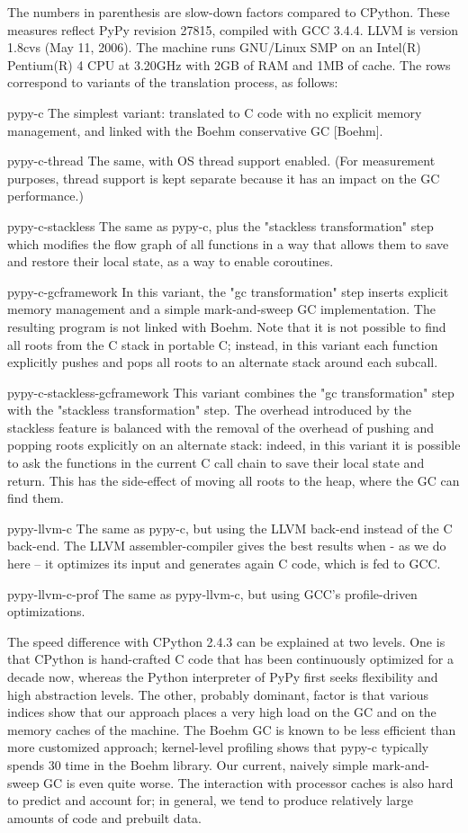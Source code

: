 \documentclass{acm_proc_article-sp}
\begin{document}
The numbers in parenthesis are slow-down factors compared to CPython.
These measures reflect PyPy revision 27815, compiled with GCC 3.4.4.
LLVM is version 1.8cvs (May 11, 2006).  The machine runs GNU/Linux SMP
on an Intel(R) Pentium(R) 4 CPU at 3.20GHz with 2GB of RAM and 1MB of
cache.  The rows correspond to variants of the translation process, as
follows:

pypy-c
    The simplest variant: translated to C code with no explicit memory
    management, and linked with the Boehm conservative GC [Boehm].

pypy-c-thread
    The same, with OS thread support enabled.  (For measurement purposes,
    thread support is kept separate because it has an impact on the GC
    performance.)

pypy-c-stackless
    The same as pypy-c, plus the "stackless transformation" step which
    modifies the flow graph of all functions in a way that allows them
    to save and restore their local state, as a way to enable coroutines.

pypy-c-gcframework
    In this variant, the "gc transformation" step inserts explicit
    memory management and a simple mark-and-sweep GC implementation.
    The resulting program is not linked with Boehm.  Note that it is not
    possible to find all roots from the C stack in portable C; instead,
    in this variant each function explicitly pushes and pops all roots
    to an alternate stack around each subcall.

pypy-c-stackless-gcframework
    This variant combines the "gc transformation" step with the
    "stackless transformation" step.  The overhead introduced by the
    stackless feature is balanced with the removal of the overhead of
    pushing and popping roots explicitly on an alternate stack: indeed,
    in this variant it is possible to ask the functions in the current C
    call chain to save their local state and return.  This has the
    side-effect of moving all roots to the heap, where the GC can find
    them.

pypy-llvm-c
    The same as pypy-c, but using the LLVM back-end instead of the C
    back-end.  The LLVM assembler-compiler gives the best results when -
    as we do here -- it optimizes its input and generates again C code,
    which is fed to GCC.

pypy-llvm-c-prof
    The same as pypy-llvm-c, but using GCC's profile-driven
    optimizations.

The speed difference with CPython 2.4.3 can be explained at two levels.
One is that CPython is hand-crafted C code that has been continuously
optimized for a decade now, whereas the Python interpreter of PyPy first
seeks flexibility and high abstraction levels.  The other, probably
dominant, factor is that various indices show that our approach places a
very high load on the GC and on the memory caches of the machine.  The
Boehm GC is known to be less efficient than more customized approach;
kernel-level profiling shows that pypy-c typically spends 30%
time in the Boehm library.  Our current, naively simple mark-and-sweep
GC is even quite worse.  The interaction with processor caches is also
hard to predict and account for; in general, we tend to produce
relatively large amounts of code and prebuilt data.
\end{document}

